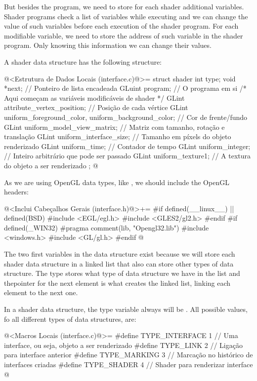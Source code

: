 But besides the program, we need to store for each shader additional
variables. Shader programs check a list of variables while executing
and we can change the value of such variables before each execution of
the shader program. For each modifiable variable, we need to store the
address of such variable in the shader program. Only knowing this
information we can change their values.

A shader data structure has the following structure:

\iniciocodigo
@<Estrutura de Dados Locais (interface.c)@>=
struct shader {
  int type;
  void *next; // Ponteiro de lista encadeada
  GLuint program; // O programa em si
  /* Aqui começam as variáveis modificáveis de shader */
  GLint attribute_vertex_position; // Posição de cada vértice
  GLint uniform_foreground_color, uniform_background_color; // Cor de frente/fundo
  GLint uniform_model_view_matrix; // Matriz com tamanho, rotação e translação
  GLint uniform_interface_size; // Tamanho em píxels do objeto renderizado
  GLint uniform_time; // Contador de tempo
  GLint uniform_integer; // Inteiro arbitrário que pode ser passado
  GLint uniform_texture1; // A textura do objeto a ser renderizado
};
@
\fimcodigo

As we are using OpenGL data types, like , we should
include the OpenGL headers:

\iniciocodigo
@<Inclui Cabeçalhos Gerais (interface.h)@>+=
#if defined(__linux__) || defined(BSD)
#include <EGL/egl.h>
#include <GLES2/gl2.h>
#endif
#if defined(_WIN32)
#pragma comment(lib, "Opengl32.lib")
#include <windows.h>
#include <GL/gl.h>
#endif
@
\fimcodigo

The two first variables in the data structure exist because we will
store each shader data structure in a linked list that also can store
other types of data structure. The type stores what type of data
structure we have in the list and thepointer for the next element is
what creates the linked list, linking each element to the next one.

In a shader data structure, the type variable always will
be . All possible values, fo all different
types of data structures, are:

\iniciocodigo
@<Macros Locais (interface.c)@>=
#define TYPE_INTERFACE 1 // Uma interface, ou seja, objeto a ser renderizado
#define TYPE_LINK      2 // Ligação para interface anterior
#define TYPE_MARKING   3 // Marcação no histórico de interfaces criadas
#define TYPE_SHADER    4 // Shader para renderizar interface
@
\fimcodigo

